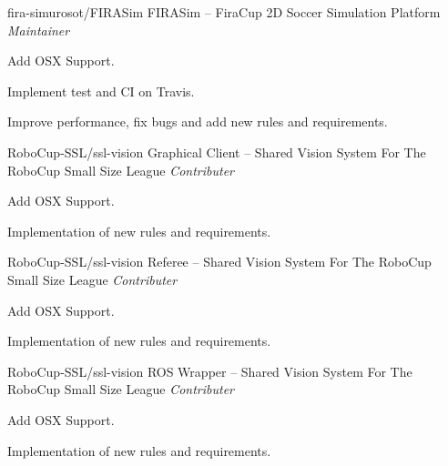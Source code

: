 
\begin{cventries}
  \cventry
    {fira-simurosot/FIRASim} %
    {FIRASim -- FiraCup 2D Soccer Simulation Platform } %
    {\textit{Maintainer}} %
    {} %
    {
      \begin{cvitems} %
        \item {Add OSX Support.}
        \item {Implement test and CI on Travis.}
        \item {Improve performance, fix bugs and add new rules and requirements.}
      \end{cvitems}
    }

  \cventry
    {RoboCup-SSL/ssl-vision} %
    {Graphical Client -- Shared Vision System For The RoboCup Small Size League} %
    {\textit{Contributer}} %
    {} %
    {
      \begin{cvitems} %
        \item {Add OSX Support.}
        \item {Implementation of new rules and requirements.}
      \end{cvitems}
    }
    
  \cventry
    {RoboCup-SSL/ssl-vision} %
    {Referee -- Shared Vision System For The RoboCup Small Size League} %
    {\textit{Contributer}} %
    {} %
    {
      \begin{cvitems} %
        \item {Add OSX Support.}
        \item {Implementation of new rules and requirements.}
      \end{cvitems}
    }
    
  \cventry
    {RoboCup-SSL/ssl-vision} %
    {ROS Wrapper -- Shared Vision System For The RoboCup Small Size League} %
    {\textit{Contributer}} %
    {} %
    {
      \begin{cvitems} %
        \item {Add OSX Support.}
        \item {Implementation of new rules and requirements.}
      \end{cvitems}
    }
    
\end{cventries}